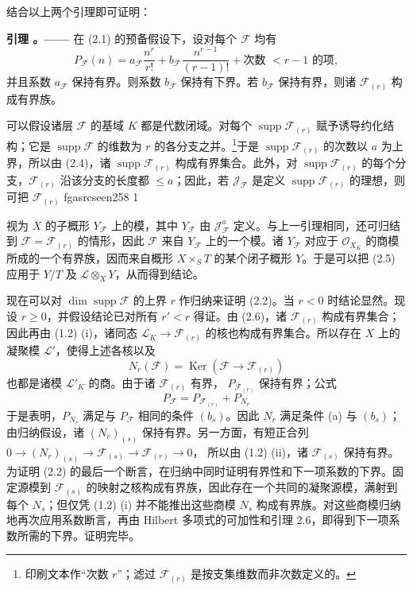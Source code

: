 \documentclass[12pt,twoside,openany]{book}
\numberwithin{equation}{section}
\newcommand{\fgaunitid}{unbound}
\newcommand{\src}[1]{%
  \phantomsection
  \hypertarget{src:\fgaunitid:#1}{}%
  \hypertarget{fga.\fgaunitid.p#1}{}%
  \ifcsname fgasrcseen#1\endcsname\else
    \expandafter\gdef\csname fgasrcseen#1\endcsname{1}%
    \hypertarget{src:#1}{}%
  \fi
  \marginpar{\raggedleft\footnotesize\sffamily #1}%
}
\theoremstyle{plain}
\theoremstyle{definition}
\theoremstyle{remark}
\newcommand{\result}[2]{%
  \par\medskip\noindent\textbf{#1%
  \if\relax\detokenize{#2}\relax\else\space#2\fi。——}\enspace
}
\begin{document}
结合以上两个引理即可证明：

\result{引理}{2.6} 在 (2.1) 的预备假设下，设对每个 $\mathcal F$ 均有
\[
P_{\mathcal F}(n)=a_{\mathcal F}\frac{n^r}{r!}
+b_{\mathcal F}\frac{n^{r-1}}{(r-1)!}
+\text{次数 $<r-1$ 的项},
\]
并且系数 $a_{\mathcal F}$ 保持有界。则系数 $b_{\mathcal F}$ 保持有下界。若 $b_{\mathcal F}$ 保持有界，则诸 $\mathcal F_{(r)}$ 构成有界族。

可以假设诸层 $\mathcal F$ 的基域 $K$ 都是代数闭域。对每个
$\operatorname{supp}\mathcal F_{(r)}$ 赋予诱导约化结构；它是
$\operatorname{supp}\mathcal F$ 的维数为 $r$ 的各分支之并。\footnote{印刷文本作“次数 $r$”；滤过 $\mathcal F_{(r)}$ 是按支集维数而非次数定义的。}于是
$\operatorname{supp}\mathcal F_{(r)}$ 的次数以 $a$ 为上界，所以由
(2.4)，诸 $\operatorname{supp}\mathcal F_{(r)}$ 构成有界集合。此外，对
$\operatorname{supp}\mathcal F_{(r)}$ 的每个分支，$\mathcal F_{(r)}$ 沿该分支的长度都 $\leq a$；因此，若 $\mathcal J_{\mathcal F}$ 是定义
$\operatorname{supp}\mathcal F_{(r)}$ 的理想，则可把
$\mathcal F_{(r)}$
\src{258}
视为 $X$ 的子概形 $Y_{\mathcal F}$ 上的模，其中
$Y_{\mathcal F}$ 由 $\mathcal J_{\mathcal F}^{a}$ 定义。与上一引理相同，还可归结到 $\mathcal F=\mathcal F_{(r)}$ 的情形，因此
$\mathcal F$ 来自 $Y_{\mathcal F}$ 上的一个模。诸 $Y_{\mathcal F}$ 对应于
$\mathcal O_{X_K}$ 的商模所成的一个有界族，因而来自概形
$X\times_S T$ 的某个闭子概形 $Y$。于是可以把 (2.5) 应用于
$Y/T$ 及 $\mathcal L\otimes_XY$，从而得到结论。

现在可以对 $\dim\operatorname{supp}\mathcal F$ 的上界 $r$ 作归纳来证明
(2.2)。当 $r<0$ 时结论显然。现设 $r\geq0$，并假设结论已对所有
$r'<r$ 得证。由 (2.6)，诸 $\mathcal F_{(r)}$ 构成有界集合；因此再由
(1.2) (i)，诸同态
$\mathcal L_K\longrightarrow\mathcal F_{(r)}$ 的核也构成有界集合。所以存在 $X$ 上的凝聚模 $\mathcal L'$，使得上述各核以及
\[
N_r(\mathcal F)=\operatorname{Ker}(\mathcal F\longrightarrow\mathcal F_{(r)})
\]
也都是诸模 $\mathcal L'_K$ 的商。由于诸 $\mathcal F_{(r)}$ 有界，
$P_{\mathcal F_{(r)}}$ 保持有界；公式
\[
P_{\mathcal F}=P_{\mathcal F_{(r)}}+P_{N_r}
\]
于是表明，$P_{N_r}$ 满足与 $P_{\mathcal F}$ 相同的条件 $(b_s)$。因此
$N_r$ 满足条件 (a) 与 $(b_s)$；由归纳假设，诸
$(N_r)_{(s)}$ 保持有界。另一方面，有短正合列
$0\longrightarrow(N_r)_{(s)}\longrightarrow\mathcal F_{(s)}
\longrightarrow\mathcal F_{(r)}\longrightarrow0$，
所以由 (1.2) (ii)，诸 $\mathcal F_{(s)}$ 保持有界。为证明 (2.2) 的最后一个断言，在归纳中同时证明有界性和下一项系数的下界。固定源模到 $\mathcal F_{(s)}$ 的映射之核构成有界族，因此存在一个共同的凝聚源模，满射到每个 $N_s$；但仅凭 (1.2) (i) 并不能推出这些商模 $N_s$ 构成有界族。对这些商模归纳地再次应用系数断言，再由 Hilbert 多项式的可加性和引理 2.6，即得到下一项系数所需的下界。证明完毕。
\end{document}
